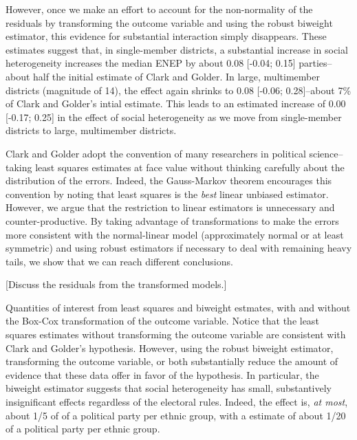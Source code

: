 \documentclass[12pt]{article}
\begin{document}
However, once we make an effort to account for the non-normality of the residuals by transforming the outcome variable and using the robust biweight estimator, this evidence for substantial interaction simply disappears. These estimates suggest that, in single-member districts, a substantial increase in social heterogeneity increases the median ENEP by about 0.08 [-0.04; 0.15] parties--about half the initial estimate of Clark and Golder. In large, multimember districts (magnitude of 14), the effect again shrinks to 0.08 [-0.06; 0.28]--about 7\% of Clark and Golder's intial estimate. This leads to an estimated increase of 0.00 [-0.17; 0.25] in the effect of social heterogeneity as we move from single-member districts to large, multimember districts. 

Clark and Golder adopt the convention of many researchers in political science--taking least squares estimates at face value without thinking carefully about the distribution of the errors. Indeed, the Gauss-Markov theorem encourages this convention by noting that least squares is the \textit{best} linear unbiased estimator. However, we argue that the restriction to linear estimators is unnecessary and counter-productive. By taking advantage of transformations to make the errors more consistent with the normal-linear model (approximately normal or at least symmetric) and using robust estimators if necessary to deal with remaining heavy tails, we show that we can reach different conclusions. 

[Discuss the residuals from the transformed models.]

\begin{table}
{\scriptsize

}
\caption{Quantities of interest from least squares and biweight estmates, with and without the Box-Cox transformation of the outcome variable. Notice that the least squares estimates without transforming the outcome variable are consistent with Clark and Golder's hypothesis. However, using the robust biweight estimator,  transforming the outcome variable, or both substantially reduce the amount of evidence that these data offer in favor of the hypothesis. In particular, the biweight estimator suggests that social heterogeneity has small, substantively insignificant effects regardless of the electoral rules. Indeed, the effect is, \textit{at most}, about 1/5 of of a political party per ethnic group, with a estimate of about 1/20 of a political party per ethnic group. }\label{tab:cg-qi}
\end{table}
\end{document}
